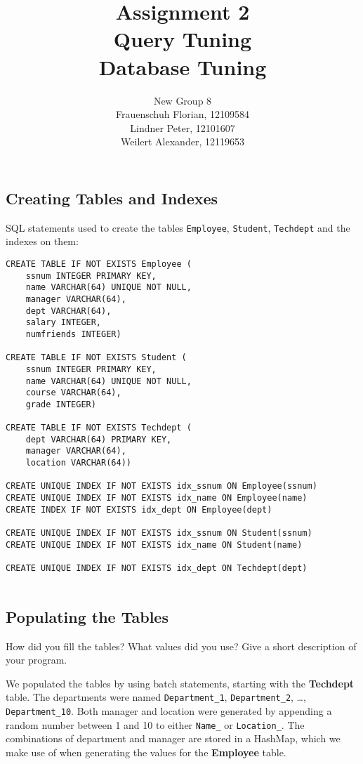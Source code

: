 \documentclass[11pt]{scrartcl}
\title{
    \textbf{\large Assignment 2} \\
    Query Tuning \\
    {\large Database Tuning}
}
\author{
    New Group 8 \\
    \large Frauenschuh Florian, 12109584 \\
    \large Lindner Peter, 12101607 \\
    \large Weilert Alexander, 12119653
}
\begin{document}
    \maketitle\thispagestyle{empty}

    \subsection*{Creating Tables and Indexes}

    SQL statements used to create the tables \texttt{Employee}, \texttt{Student}, \texttt{Techdept} and the indexes on
    them:

    \begin{lstlisting}[style=dbtsql]
CREATE TABLE IF NOT EXISTS Employee (
    ssnum INTEGER PRIMARY KEY, 
    name VARCHAR(64) UNIQUE NOT NULL, 
    manager VARCHAR(64), 
    dept VARCHAR(64), 
    salary INTEGER, 
    numfriends INTEGER)

CREATE TABLE IF NOT EXISTS Student (
    ssnum INTEGER PRIMARY KEY, 
    name VARCHAR(64) UNIQUE NOT NULL,
    course VARCHAR(64), 
    grade INTEGER)

CREATE TABLE IF NOT EXISTS Techdept (
    dept VARCHAR(64) PRIMARY KEY, 
    manager VARCHAR(64), 
    location VARCHAR(64))

CREATE UNIQUE INDEX IF NOT EXISTS idx_ssnum ON Employee(ssnum)
CREATE UNIQUE INDEX IF NOT EXISTS idx_name ON Employee(name)
CREATE INDEX IF NOT EXISTS idx_dept ON Employee(dept)

CREATE UNIQUE INDEX IF NOT EXISTS idx_ssnum ON Student(ssnum)
CREATE UNIQUE INDEX IF NOT EXISTS idx_name ON Student(name)

CREATE UNIQUE INDEX IF NOT EXISTS idx_dept ON Techdept(dept)


    \end{lstlisting}

    \subsection*{Populating the Tables}

    How did you fill the tables? What values did you use? Give a short description of your program.

    We populated the tables by using batch statements, starting with the \textbf{Techdept} table.
    The departments were named \texttt{Department\_1}, \texttt{Department\_2}, \dots, \texttt{Department\_10}.
    Both manager and location were generated by appending a random number between 1 and 10 to either \texttt{Name\_} or \texttt{Location\_}.
    The combinations of department and manager are stored in a HashMap, which we make use of when generating the values for the \textbf{Employee} table.
\end{document}
